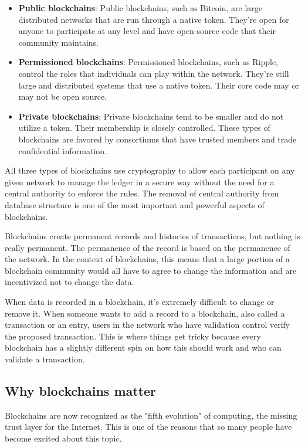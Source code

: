 \documentclass[MSE,Master,english]{twbook}%
\begin{document}
\begin{itemize}
  \item \textbf{Public blockchains}: Public blockchains, such as Bitcoin, are large distributed networks that are run through a native token. They're open for anyone to participate at any level and have open-source code that their community maintains.
  \item \textbf{Permissioned blockchains}: Permissioned blockchains, such as Ripple, control the roles that individuals can play within the network. They're still large and distributed systems that use a native token. Their core code may or may not be open source.
  \item \textbf{Private blockchains}: Private blockchains tend to be smaller and do not utilize a token. Their membership is closely controlled. These types of blockchains are favored by consortiums that have trusted members and trade confidential information.
\end{itemize}

All three types of blockchains use cryptography to allow each participant on any given network to manage the ledger in a secure way without the need for a central authority to enforce the rules. The removal of central authority from database structure is one of the most important and powerful aspects of blockchains.

Blockchains create permanent records and histories of transactions, but nothing is really permanent. The permanence of the record is based on the permanence of the network. In the context of blockchains, this means that a large portion of a blockchain community would all have to agree to change the information and are incentivized not to change the data. 

When data is recorded in a blockchain, it's extremely difficult to change or remove it. When someone wants to add a record to a blockchain, also called a transaction or an entry, users in the network who have validation control verify the proposed transaction. This is where things get tricky because every blockchain has a slightly different spin on how this should work and who can validate a transaction.

\subsection{Why blockchains matter}

Blockchains are now recognized as the "fifth evolution"\cite{blockchainDummies} of computing, the missing trust layer for the Internet. This is one of the reasons that so many people have become excited about this topic. 
\end{document}
